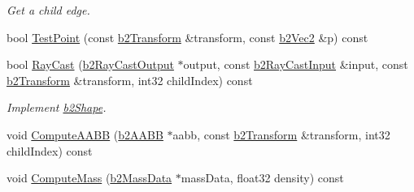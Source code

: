\begin{DoxyCompactItemize}
\begin{DoxyCompactList}\small\item\em Get a child edge. \end{DoxyCompactList}\item 
bool \hyperlink{classb2_chain_shape_a4fc27b41ecc556985efacf8e0f91c39f}{Test\+Point} (const \hyperlink{structb2_transform}{b2\+Transform} \&transform, const \hyperlink{structb2_vec2}{b2\+Vec2} \&p) const 
\item 
bool \hyperlink{classb2_chain_shape_a85c7a17a15581e0e258c7af561cf5403}{Ray\+Cast} (\hyperlink{structb2_ray_cast_output}{b2\+Ray\+Cast\+Output} $\ast$output, const \hyperlink{structb2_ray_cast_input}{b2\+Ray\+Cast\+Input} \&input, const \hyperlink{structb2_transform}{b2\+Transform} \&transform, int32 child\+Index) const \hypertarget{classb2_chain_shape_a85c7a17a15581e0e258c7af561cf5403}{}\label{classb2_chain_shape_a85c7a17a15581e0e258c7af561cf5403}

\begin{DoxyCompactList}\small\item\em Implement \hyperlink{classb2_shape}{b2\+Shape}. \end{DoxyCompactList}\item 
void \hyperlink{classb2_chain_shape_a409c21206e4c84f66700809aac5b164c}{Compute\+A\+A\+BB} (\hyperlink{structb2_a_a_b_b}{b2\+A\+A\+BB} $\ast$aabb, const \hyperlink{structb2_transform}{b2\+Transform} \&transform, int32 child\+Index) const 
\item 
void \hyperlink{classb2_chain_shape_a009259d589abebeda27fe580d117b11e}{Compute\+Mass} (\hyperlink{structb2_mass_data}{b2\+Mass\+Data} $\ast$mass\+Data, float32 density) const 
\end{DoxyCompactItemize}
